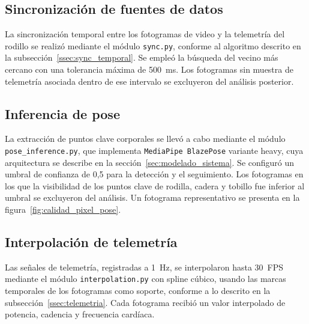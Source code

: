 \subsection{Sincronización de fuentes de datos}
\label{ssec:sync}

La sincronización temporal entre los fotogramas de video y la telemetría del
rodillo se realizó mediante el módulo \texttt{sync.py}, conforme al algoritmo
descrito en la subsección~\ref{ssec:sync_temporal}. Se empleó la búsqueda del
vecino más cercano con una tolerancia máxima de 500~ms. Los fotogramas sin
muestra de telemetría asociada dentro de ese intervalo se excluyeron del
análisis posterior.

\subsection{Inferencia de pose}
\label{ssec:inferencia_pose}

La extracción de puntos clave corporales se llevó a cabo mediante el
módulo \texttt{pose\_inference.py}, que implementa \texttt{MediaPipe BlazePose}
variante heavy, cuya arquitectura se describe en la sección~\ref{sec:modelado_sistema}.
Se configuró un umbral de confianza de 0{,}5 para la detección y el seguimiento.
Los fotogramas en los que la visibilidad de los puntos clave de rodilla, cadera
y tobillo fue inferior al umbral se excluyeron del análisis.
Un fotograma representativo se presenta en la figura~\ref{fig:calidad_pixel_pose}.

\subsection{Interpolación de telemetría}
\label{ssec:interpolacion}

Las señales de telemetría, registradas a 1~Hz, se interpolaron hasta 30~FPS
mediante el módulo \texttt{interpolation.py} con spline cúbico, usando las
marcas temporales de los fotogramas como soporte, conforme a lo descrito en
la subsección~\ref{ssec:telemetria}. Cada fotograma recibió un valor interpolado
de potencia, cadencia y frecuencia cardíaca.

